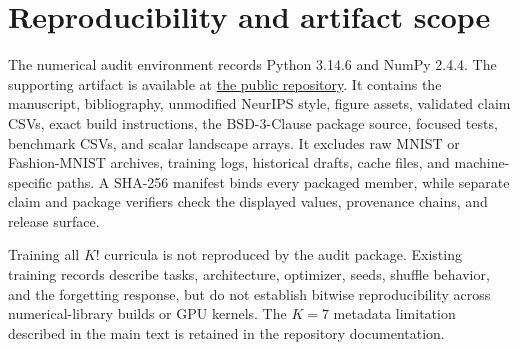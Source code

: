 \documentclass{article}
\begin{document}
\section{Reproducibility and artifact scope}

The numerical audit environment records Python 3.14.6 and NumPy 2.4.4. The supporting artifact is available at \href{https://github.com/szymonghost/Task-order-spectral-audit}{the public repository}. It contains the manuscript, bibliography, unmodified NeurIPS style, figure assets, validated claim CSVs, exact build instructions, the BSD-3-Clause package source, focused tests, benchmark CSVs, and scalar landscape arrays. It excludes raw MNIST or Fashion-MNIST archives, training logs, historical drafts, cache files, and machine-specific paths. A SHA-256 manifest binds every packaged member, while separate claim and package verifiers check the displayed values, provenance chains, and release surface.

Training all $K!$ curricula is not reproduced by the audit package. Existing training records describe tasks, architecture, optimizer, seeds, shuffle behavior, and the forgetting response, but do not establish bitwise reproducibility across numerical-library builds or GPU kernels. The $K=7$ metadata limitation described in the main text is retained in the repository documentation.
\end{document}
